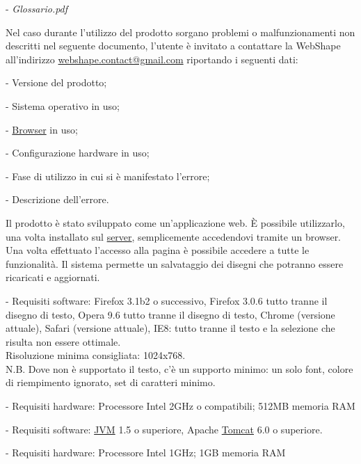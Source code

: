  
\begin{elencopuntato}[\normindent]
  \item[-] \textit{Glossario.pdf}
\end{elencopuntato}
 
Nel caso durante l'utilizzo del prodotto sorgano problemi o malfunzionamenti non descritti nel seguente documento, l'utente \`e invitato a contattare la WebShape all'indirizzo \href{mailto:webshape.contact@gmail.com}{webshape.contact@gmail.com} riportando i seguenti dati:\\
\begin{elencopuntato}[\normindent]
  \item[-] Versione del prodotto;
  \item[-] Sistema operativo in uso;
  \item[-] \underline{Browser} in uso;
  \item[-] Configurazione hardware in uso;
  \item[-] Fase di utilizzo in cui si \`e manifestato l'errore;
  \item[-] Descrizione dell'errore.
\end{elencopuntato}
 
 
Il prodotto \`e stato sviluppato come un'applicazione web. \`E possibile utilizzarlo, una volta installato sul \underline{server}, semplicemente accedendovi tramite un browser. Una volta effettuato l'accesso alla pagina \`e possibile accedere a tutte le
funzionalit\`a. Il sistema permette un salvataggio dei disegni che potranno essere ricaricati e aggiornati.
 
\begin{elencopuntato}[\normindent]
    \item[-] Requisiti software: Firefox 3.1b2 o successivo, Firefox 3.0.6 tutto tranne il disegno di testo, Opera 9.6 tutto tranne il disegno di testo, Chrome (versione attuale), Safari (versione attuale), IE8: tutto tranne il testo e la selezione che risulta non essere ottimale.\\
    Risoluzione minima consigliata: 1024x768.\\
N.B. Dove non \`e supportato il testo, c'\`e un supporto minimo: un solo font, colore di riempimento ignorato, set di caratteri minimo.
    \item[-] Requisiti hardware: Processore Intel 2GHz o compatibili; 512MB memoria RAM
\end{elencopuntato}
\begin{elencopuntato}[\normindent]
    \item[-] Requisiti software: \underline{JVM} 1.5 o superiore, Apache \underline{Tomcat} 6.0 o superiore.
    \item[-] Requisiti hardware: Processore Intel 1GHz; 1GB memoria RAM
\end{elencopuntato}
 
